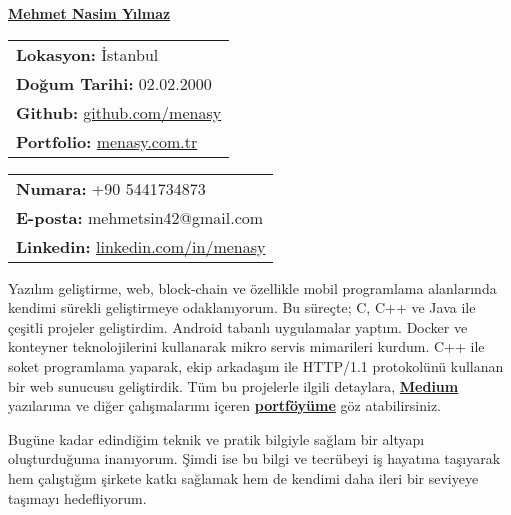\documentclass[a4paper,11pt]{article}
\begin{document}
\vspace*{-6.5em} 
\begin{center}
    \href{https://menasy.com.tr/}{\LARGE \textbf{Mehmet Nasim Yılmaz}}
\end{center}
\vspace*{0.5em} 
\noindent
\begin{minipage}[t]{0.48\textwidth}
    \begin{tabular}{@{}l}
        \textbf{Lokasyon:} İstanbul \\
        \textbf{Doğum Tarihi:} 02.02.2000 \\
        \textbf{Github:} \href{https://github.com/menasy}{github.com/menasy} \\
        \textbf{Portfolio:} \href{https://menasy.com.tr/}{menasy.com.tr} \\
    \end{tabular}
\end{minipage}%
\hfill
\begin{minipage}[t]{0.48\textwidth}
    \raggedleft
    \begin{tabular}{@{}l}
        \textbf{Numara:} +90 5441734873 \\
        \textbf{E-posta:} mehmetsin42@gmail.com \\
        \textbf{Linkedin:} \href{https://linkedin.com/in/menasy}{linkedin.com/in/menasy} \\
    \end{tabular}
\end{minipage}

\vspace{0.7em}

Yazılım geliştirme, web, block-chain ve özellikle mobil programlama alanlarında kendimi sürekli geliştirmeye odaklanıyorum. Bu süreçte; C, C++ ve Java ile çeşitli projeler geliştirdim. Android tabanlı uygulamalar yaptım. Docker ve konteyner teknolojilerini kullanarak mikro servis mimarileri kurdum. C++ ile soket programlama yaparak, ekip arkadaşım ile HTTP/1.1 protokolünü kullanan bir web sunucusu geliştirdik. Tüm bu projelerle ilgili detaylara, \textbf{\href{https://medium.com/@menasy}{Medium}} yazılarıma ve diğer çalışmalarımı içeren \textbf{\href{https://menasy.com.tr/}{portföyüme}} göz atabilirsiniz.
\vspace{-0.5em}

Bugüne kadar edindiğim teknik ve pratik bilgiyle sağlam bir altyapı oluşturduğuma inanıyorum. Şimdi ise bu bilgi ve tecrübeyi iş hayatına taşıyarak hem çalıştığım şirkete katkı sağlamak hem de kendimi daha ileri bir seviyeye taşımayı hedefliyorum.
\vspace{-0.5em}
\end{document}
